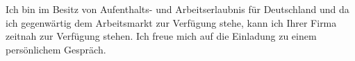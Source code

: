 \documentclass[11pt,a4paper,sans]{moderncv}        %
\begin{document}

Ich bin im Besitz von Aufenthalts- und Arbeitserlaubnis für Deutschland und da ich gegenwärtig dem Arbeitsmarkt zur Verfügung stehe, kann ich Ihrer Firma zeitnah zur Verfügung stehen.  Ich freue mich auf die Einladung zu einem persönlichem Gespräch.
\vspace{3mm}

\makeletterclosing
\end{document}
